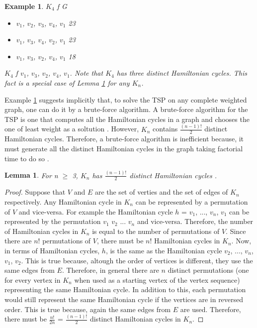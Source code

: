 \documentclass[12pt]{article}
\newtheorem{lemma}[definition]{Lemma}
\newtheorem{example}[definition]{Example}
\numberwithin{equation}{subsection}
\numberwithin{table}{subsection}
\begin{document}
\begin{example}
\label{example_2.1}
{} $K_4$ {} f {} G {}
\begin{itemize}
   \item $v_1$, $v_2$, $v_3$, $v_4$, $v_1$ {} 23
   \item $v_1$, $v_3$, $v_4$, $v_2$, $v_1$ {} 23
   \item $v_1$, $v_3$, $v_2$, $v_4$, $v_1$ {} 18
\end{itemize} 
{} $K_4$ {} f {} $v_1$, $v_3$, $v_2$, $v_4$, $v_1$. Note that $K_4$ has three distinct Hamiltonian cycles. This fact is a special case of Lemma \ref{distinct_hamiltonian_cycles} for any $K_n$. 
\end{example}
Example \ref{example_2.1} suggests implicitly that, to solve the TSP on any complete weighted graph, one can do it by a brute-force algorithm. A brute-force algorithm for the TSP is one that computes all the Hamiltonian cycles in a graph and chooses the one of least weight as a soltution \cite{Sanchit}. However, $\mathit{K_n}$ contains $\mathit{\frac{(n-1)!}{2}}$ distinct Hamiltonian cycles. Therefore, a brute-force algorithm is inefficient because, it must generate all the distinct Hamiltonian cycles in the graph taking factorial time to do so \cite{Sanchit}. 
\begin{lemma}
\label{distinct_hamiltonian_cycles}
For n $\geq$ 3, $K_n$ has $\frac{(n-1)!}{2}$ distinct Hamiltonian cycles \cite{mathematics_stack_exchange_2012}. 
\end{lemma}
\begin{proof}
Suppose that $V$ and $E$ are the set of verties and the set of edges of $K_n$ respectively. Any Hamiltonian cycle in $K_n$ can be represented by a permutation of $V$ and vice-versa. For example the Hamiltonian cycle $h$ = $v_1$, ..., $v_n$, $v_1$ can be represented by the permutation $v_1$ $v_2$ ... $v_n$ and vice-versa. Therefore, the number of Hamiltonian cycles in $K_n$ is equal to the number of permutations of $V$. Since there are $n!$ permutations of $V$, there must be $n!$ Hamiltonian cycles in $K_n$. Now, in terms of Hamiltonian cycles, $h$, is the same as the Hamiltonian cycle $v_2$, ..., $v_n$, $v_1$, $v_2$. This is true because, altough the order of vertices is different, they use the same edges from $E$. Therefore, in general there are $n$ distinct permutations (one for every vertex in $K_n$ when used as a starting vertex of the vertex sequence) representing the same Hamiltonian cycle. In addition to this, each permutation would still represent the same Hamiltonian cycle if the vertices are in reversed order. This is true because, again the same edges from $E$ are used. Therefore, there must be $\frac{n!}{2n}$ = $\frac{(n-1)!}{2}$ distinct Hamiltonian cycles in $K_n$.
\end{proof}
\end{document}
